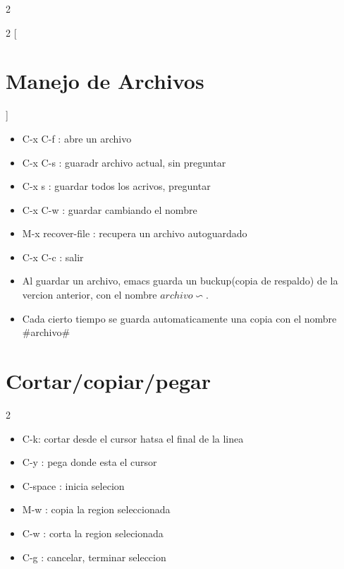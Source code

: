 \documentclass[a4paper, twocolumn]{article}
\begin{document}
\begin{landscape}
\begin{multicols}{2}
\begin{multicols}{2}
[
\section*{Manejo de Archivos}
]
\begin{itemize}
	\item C-x C-f : abre un archivo
	\item C-x C-s : guaradr archivo actual, sin preguntar
	\item C-x s : guardar todos los acrivos, preguntar
	\item C-x C-w : guardar cambiando el nombre

	\item M-x recover-file : recupera un archivo autoguardado
	\item C-x C-c : salir

\end{itemize}


\end{multicols}
\begin{flushleft}
\begin{itemize}
	\item Al guardar un archivo, emacs guarda un buckup(copia de respaldo) de la vercion anterior, con el nombre $archivo\backsim$.
	\item Cada cierto tiempo se guarda automaticamente una copia con el nombre \#archivo\#
\end{itemize}
\end{flushleft}

\section*{Cortar/copiar/pegar}
\begin{multicols}{2}
\begin{itemize}
	\item C-k: cortar desde el cursor hatsa el final de la linea
	\item C-y : pega donde esta el cursor
	\item C-space : inicia selecion
	\item M-w : copia la region seleccionada
	\item C-w : corta la region selecionada
	\item C-g : cancelar, terminar seleccion
\end{itemize}
\end{multicols}


\end{multicols}
\end{landscape}
\end{document}
